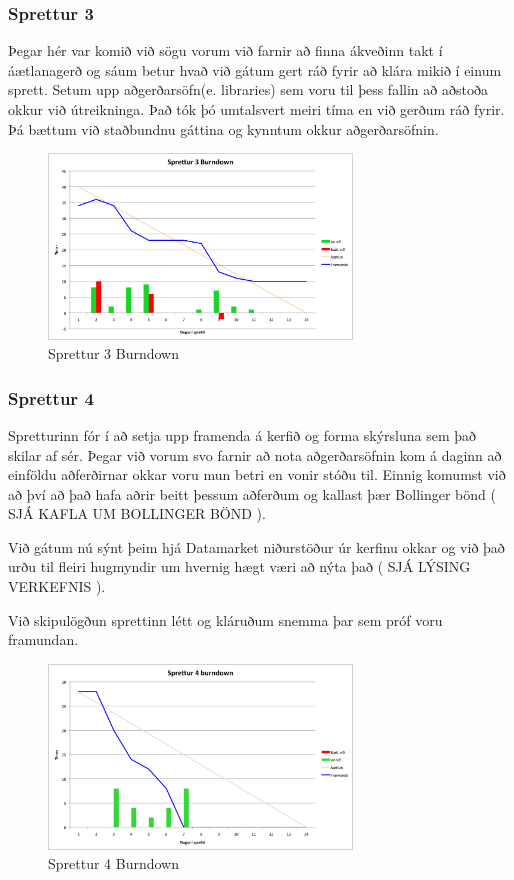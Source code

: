 \documentclass{article}
\begin{document}
\subsubsection{Sprettur 3}
Þegar hér var komið við sögu vorum við farnir að finna ákveðinn takt í
áætlanagerð og sáum betur hvað við gátum gert ráð fyrir að klára mikið 
í einum sprett. Setum upp aðgerðarsöfn(e. libraries) sem voru til þess fallin að
aðstoða okkur við útreikninga. Það tók þó umtalsvert meiri tíma en við gerðum
ráð fyrir. Þá bættum við staðbundnu gáttina og kynntum okkur aðgerðarsöfnin.
\begin{figure}[H]
 \centering
 \includegraphics[width=0.72\textwidth]{Sprettur3_Burndown.png}
 \caption{Sprettur 3 Burndown}
\end{figure}
\subsubsection{Sprettur 4}
Spretturinn fór í að setja upp framenda á kerfið og forma skýrsluna sem það
skilar af sér. Þegar við vorum svo farnir að nota aðgerðarsöfnin 
kom á daginn að einföldu aðferðirnar okkar voru mun betri en vonir stóðu til.
Einnig komumst við að því að það hafa aðrir beitt þessum aðferðum 
og kallast þær Bollinger bönd ( SJÁ KAFLA UM BOLLINGER BÖND ). 

Við gátum nú sýnt þeim hjá Datamarket niðurstöður úr kerfinu okkar og við það
urðu til fleiri hugmyndir um hvernig hægt væri að nýta það ( SJÁ LÝSING
VERKEFNIS ).

Við skipulögðun sprettinn létt og kláruðum snemma þar sem próf voru framundan.
\begin{figure}[H]
 \centering
 \includegraphics[width=0.72\textwidth]{Sprettur4_Burndown.png}
 \caption{Sprettur 4 Burndown}
\end{figure}
\end{document}
